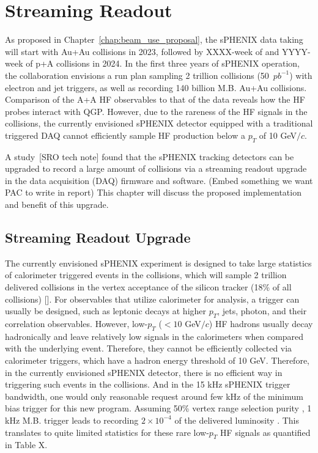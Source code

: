 \chapter{Streaming Readout}
\label{chap:streaming_readout}

As proposed in Chapter~\ref{chap:beam_use_proposal}, the sPHENIX data taking will start with Au+Au collisions in 2023, followed by XXXX-week of \pp and YYYY-week of p+A collisions in 2024.  In the first three years of sPHENIX operation, the collaboration envisions a run plan sampling 2 trillion \pp collisions (50~$pb^{-1}$)  with electron and jet triggers, as well as recording 140 billion M.B. Au+Au collisions. Comparison of the A+A HF observables to that of the \pp data reveals how the HF probes interact with QGP. However, due to the rareness of the HF signals in the \pp collisions, the currently envisioned sPHENIX detector equipped with a traditional triggered  DAQ cannot efficiently sample HF production below a $p_T$ of 10 GeV$/c$. 
 
A study~[SRO tech note] found that the sPHENIX tracking detectors can be upgraded to record a large amount of \pp collisions via a streaming readout upgrade in the data acquisition (DAQ) firmware and software. 
(Embed something we want PAC to write in report) 
This chapter will discuss the proposed implementation and benefit of this upgrade. 
 

 
\section{Streaming Readout Upgrade}
 
 The currently envisioned sPHENIX experiment is designed to take large statistics of calorimeter triggered events in the \pp collisions, which will sample 2 trillion delivered \pp collisions in the vertex acceptance of the silicon tracker (18\% of all collisions) []. For observables that utilize calorimeter for analysis, a trigger can usually be designed, such as leptonic decays at higher $p_T$, jets, photon, and their correlation observables. However, low-$p_T$  ($<10$ GeV$/c$) HF hadrons usually decay hadronically and leave relatively low signals in the calorimeters when compared with the underlying event. Therefore, they cannot be efficiently collected via calorimeter triggers, which have a hadron energy threshold of 10 GeV. Therefore, in the currently envisioned sPHENIX detector, there is no efficient way in triggering such events in the \pp collisions. And in the 15 kHz sPHENIX trigger bandwidth, one would only reasonable request around few kHz of the minimum bias \pp trigger for this new program. Assuming 50\% vertex range selection purity , 1 kHz M.B. trigger leads to recording $2\times10^{-4}$ of the delivered luminosity . This translates to quite limited statistics for these rare low-$p_T$ HF signals as quantified in Table X.
 
